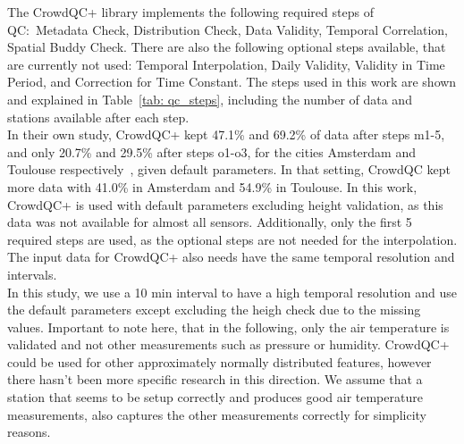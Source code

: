 The CrowdQC+ library implements the following required steps of QC:\ Metadata Check, Distribution Check, Data Validity, Temporal Correlation, Spatial Buddy Check. There are also the following optional steps available, that are currently not used: Temporal Interpolation, Daily Validity, Validity in Time Period, and Correction for Time Constant.
The steps used in this work are shown and explained in Table~\ref{tab: qc_steps}, including the number of data and stations available after each step.\\
In their own study, CrowdQC+ kept 47.1\% and 69.2\% of data after steps m1-5, and only 20.7\% and 29.5\% after steps o1-o3, for the cities Amsterdam and Toulouse respectively~\cite{fenner2021crowdqc+}, given default parameters. In that setting, CrowdQC kept more data with 41.0\% in Amsterdam and 54.9\% in Toulouse. In this work, CrowdQC+ is used with default parameters excluding height validation, as this data was not available for almost all sensors. Additionally, only the first 5 required steps are used, as the optional steps are not needed for the interpolation. The input data for CrowdQC+ also needs have the same temporal resolution and intervals.\\
In this study, we use a 10 min interval to have a high temporal resolution and use the default parameters except excluding the heigh check due to the missing values. Important to note here, that in the following, only the air temperature is validated and not other measurements such as pressure or humidity. CrowdQC+ could be used for other approximately normally distributed features, however there hasn't been more specific research in this direction. We assume that a station that seems to be setup correctly and produces good air temperature measurements, also captures the other measurements correctly for simplicity reasons.

